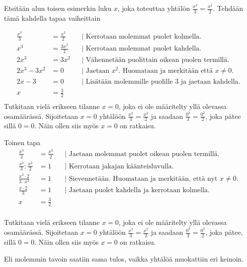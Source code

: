 \begin{esimerkki}
Etsitään alun toisen esimerkin luku $x$, joka toteuttaa yhtälön $\frac{x^3}{3}=\frac{x^2}{2}$. Tehdään tämä kahdella tapaa vaiheittain

		\begin{align*}
			\frac{x^3}{3}&=\frac{x^2}{2} && \text{| Kerrotaan molemmat puolet kolmella.} \\
			x^3 &=\frac{3x^2}{2}   && \text{| Kerrotaan molemmat puolet kahdella.} \\
			2x^3 &=3x^2 && \text{| Vähennetään puolittain oikean puolen termillä.} \\
			2x^3 -3x^2&=0 && \text{| Jaetaan $x^2$. Huomataan ja merkitään että $x\neq0$.} \\
			2x -3&=0 && \text{| Lisätään molemmille puolille $3$ ja jaetaan kahdella.} \\ 
			x&=\frac{3}{2} && \\
		\end{align*}
Tutkitaan vielä erikseen tilanne $x=0$, joka ei ole määritelty yllä olevassa osamäärässä. Sijoitetaan $x=0$ yhtälöön $\frac{x^3}{3}=\frac{x^2}{2}$ ja saadaan $\frac{0^3}{3}=\frac{0^2}{2}$, joka pätee sillä $0=0$. Näin ollen siis myös $x=0$ on ratkaisu. 

Toinen tapa
\begin{align*}
\frac{x^3}{3}&=\frac{x^2}{2} && \text{| Jaetaan molemmat puolet oikean puolen termillä. } \\
\frac{x^3}{3}:\frac{x^2}{2}&=1 && \text{| Kerrotaan jakajan käänteisluvulla.} \\
\frac{x^3\cdot2}{3\cdot x^2}&=1 && \text{| Sievennetään. Huomataan ja merkitään, että nyt $x\neq0$.} \\
\frac{x\cdot2}{3}&=1 && \text{| Jaetaan puolet kahdella ja kerrotaan kolmella.} \\
x&=\frac{3}{2} && \\
\end{align*}

Tutkitaan vielä erikseen tilanne $x=0$, joka ei ole määritelty yllä olevassa osamäärässä. Sijoitetaan $x=0$ yhtälöön $\frac{x^3}{3}=\frac{x^2}{2}$ ja saadaan $\frac{0^3}{3}=\frac{0^2}{2}$, joka pätee, sillä $0=0$. Näin ollen siis myös $x=0$ on ratkaisu.

Eli molemmin tavoin saatiin sama tulos, vaikka yhtälöä muokattiin eri keinoin.

\end{esimerkki}

